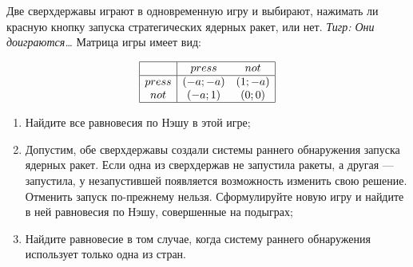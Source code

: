 \begin{problem}
Две сверхдержавы играют в одновременную игру и выбирают, нажимать ли красную кнопку запуска стратегических ядерных ракет, или нет. {\it Тигр: Они доиграются\ldots } Матрица игры имеет вид:\par
\[\begin{array}{|c|cc|}  \hline {} & {press} & {not} \\  \hline {press} & {\left(-a;-a\right)} & {\left(1;-a\right)} \\ {not} & {\left(-a;1\right)} & {\left(0;0\right)} \\  \hline  \end{array}\]
\begin{enumerate}
\item  Найдите все равновесия по Нэшу в этой игре;\par
\item Допустим, обе сверхдержавы создали системы раннего обнаружения запуска ядерных ракет. Если одна из сверхдержав не запустила ракеты, а другая --- запустила, у незапустившей появляется возможность изменить свою решение. Отменить запуск по-прежнему нельзя. Сформулируйте новую игру и найдите в ней равновесия по Нэшу, совершенные на подыграх;\par
\item  Найдите равновесие в том случае, когда систему раннего обнаружения использует только одна из стран.\par
\end{enumerate}


\begin{sol}

\end{sol}
\end{problem}



